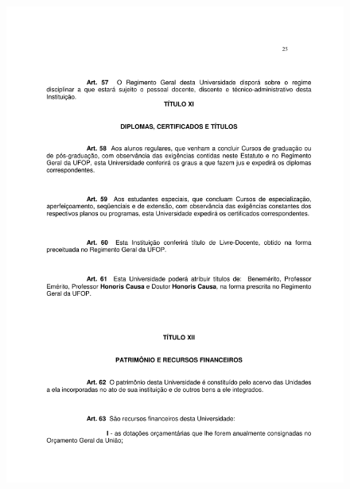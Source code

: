 \begin{figure}[p]
	\centering 
	\includegraphics[scale=0.7]{capitulos/resolucoes/cuni414/cuni414-25.pdf}
\end{figure}

